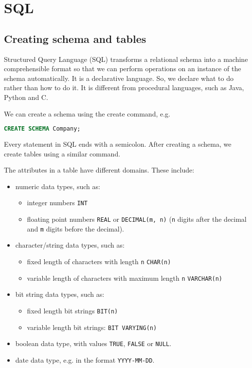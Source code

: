 \documentclass[a4paper, openany]{memoir}
\begin{document}
\chapter{SQL}

\section{Creating schema and tables}
Structured Query Language (SQL) transforms a relational schema into a machine comprehensible format so that we can perform operations on an instance of the schema automatically. It is a declarative language. So, we declare what to do rather than how to do it. It is different from procedural languages, such as Java, Python and C.

We can create a schema using the create command, e.g.
\begin{lstlisting}[language=SQL]
CREATE SCHEMA Company;
\end{lstlisting}
Every statement in SQL ends with a semicolon. After creating a schema, we create tables using a similar command.

The attributes in a table have different domains. These include:
\begin{itemize}
    \item numeric data types, such as:
    \begin{itemize}
        \item integer numbers \texttt{INT}
        \item floating point numbers \texttt{REAL} or \texttt{DECIMAL(m, n)} (\texttt{n} digits after the decimal and \texttt{m} digits before the decimal).
    \end{itemize}
    
    \item character/string data types, such as:
    \begin{itemize}
        \item fixed length of characters with length \texttt{n} \texttt{CHAR(n)}
        \item variable length of characters with maximum length \texttt{n} \texttt{VARCHAR(n)}
    \end{itemize}
    
    \item bit string data types, such as:
    \begin{itemize}
        \item fixed length bit strings \texttt{BIT(n)}
        \item variable length bit strings: \texttt{BIT VARYING(n)}
    \end{itemize}
    
    \item boolean data type, with values \texttt{TRUE}, \texttt{FALSE} or \texttt{NULL}.
    
    \item date data type, e.g. in the format \texttt{YYYY-MM-DD}.
\end{itemize}
\end{document}
